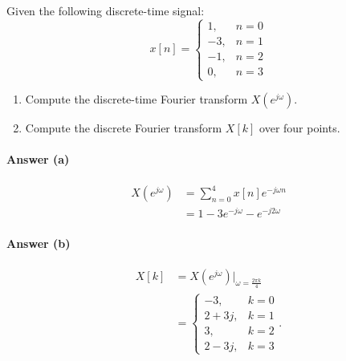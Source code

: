 \begin{q}{}
    Given the following discrete-time signal:
    \[
        x[n] = 
        \begin{cases}
            1, & n=0 \\
            -3, & n=1 \\
            -1, & n=2 \\
            0, & n=3
        \end{cases}
    \]
    \begin{enumerate}[label=(\alph*)]
        \item Compute the discrete-time Fourier transform $X(e^{j\omega})$.
        \item Compute the discrete Fourier transform $X[k]$ over four points.
    \end{enumerate}
    {\color{blue}
        \paragraph{Answer (a)}
        \begin{align*}
            X(e^{j\omega}) 
            & = \sum_{n=0}^{4} x[n] e^{-j\omega n} \\
            & = 1 - 3e^{-j\omega} - e^{-j2\omega}
        \end{align*}
    }
    {\color{blue}
        \paragraph{Answer (b)}
        \begin{align*}
            X[k] 
            & = X(e^{j\omega})\lvert_{\omega = \frac{2\pi k}{4}} \\
            & = \begin{cases}
                -3, & k = 0\\
                2+3j, & k = 1\\
                3, & k=2 \\
                2-3j, & k=3
            \end{cases}.
        \end{align*}
    }
\end{q}





